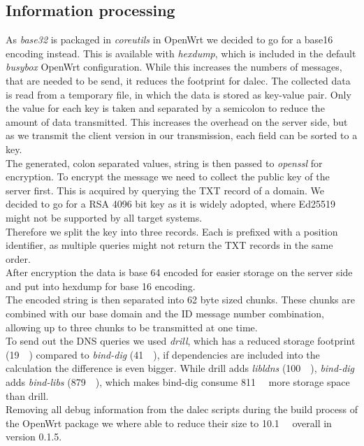 \subsection{Information processing}
    As \textit{base32} is packaged in \textit{coreutils} in OpenWrt we decided to go for a base16 encoding instead. This is available with \textit{hexdump}, which is included in the default \textit{busybox} OpenWrt configuration. While this increases the numbers of messages, that are needed to be send, it reduces the footprint for dalec. The collected data is read from a temporary file, in which the data is stored as key-value pair. Only the value for each key is taken and separated by a semicolon to reduce the amount of data transmitted. This increases the overhead on the server side, but as we transmit the client version in our transmission, each field can be sorted to a key.\\
    The generated, colon separated values, string is then passed to \textit{openssl} for encryption. To encrypt the message we need to collect the public key of the server first.
    This is acquired by querying the TXT record of a domain. We decided to go for a RSA 4096 bit key as it is widely adopted, where Ed25519 might not be supported by all target systems.\\
    Therefore we split the key into three records. Each is prefixed with a position identifier, as multiple queries might not return the TXT records in the same order.\\
    After encryption the data is base 64 encoded for easier storage on the server side and put into hexdump for base 16 encoding.\\
    The encoded string is then separated into 62 byte sized chunks. These chunks are combined with our base domain and the ID message number combination, allowing up to three chunks to be transmitted at one time.\\
    To send out the DNS queries we used \textit{drill}, which has a reduced storage footprint (\SIlist{19}{\kilo\byte}) compared to \textit{bind-dig} (\SIlist{41}{\kilo\byte}), if dependencies are included into the calculation the difference is even bigger. While drill adds \textit{libldns} (\SIlist{100}{\kilo\byte}), \textit{bind-dig}
    adds \textit{bind-libs} (\SIlist{879}{\kilo\byte}), which makes bind-dig consume \SIlist{811}{\kilo\byte} more storage space than drill.\\
    Removing all debug information from the dalec scripts during the build process of the OpenWrt package we where able to reduce their size to \SIlist{10.1}{\kilo\byte} overall in version 0.1.5.
    
